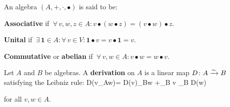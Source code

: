An algebra $(A,+,\cdot,\bullet)$ is said to be:
\ben[label=\roman*)]
\item \textbf{Associative} if $\ \forall \, v,w,z\in A : v\bullet (w\bullet z) = (v\bullet w)\bullet z$.
\item \textbf{Unital} if $\ \exists \, \mathbf{1} \in A : \forall \, v \in V : \mathbf{1}\bullet v = v \bullet \mathbf{1} = v$.
\item \textbf{Commutative} or \textbf{abelian} if $\ \forall \, v,w\in A : v\bullet w = w\bullet v$.
\een
\ed

\bd [Derivation]
Let $A$ and $B$ be algebras. A \textbf{derivation} on $A$ is a linear map $D\colon A \xrightarrow{\sim}B$ satisfying the
Leibniz rule:
\bse
D(v\bullet_Aw)= D(v)\bullet_Bw +_B v \bullet_B D(w)
\ese

for all $v,w \in A$.
\ed